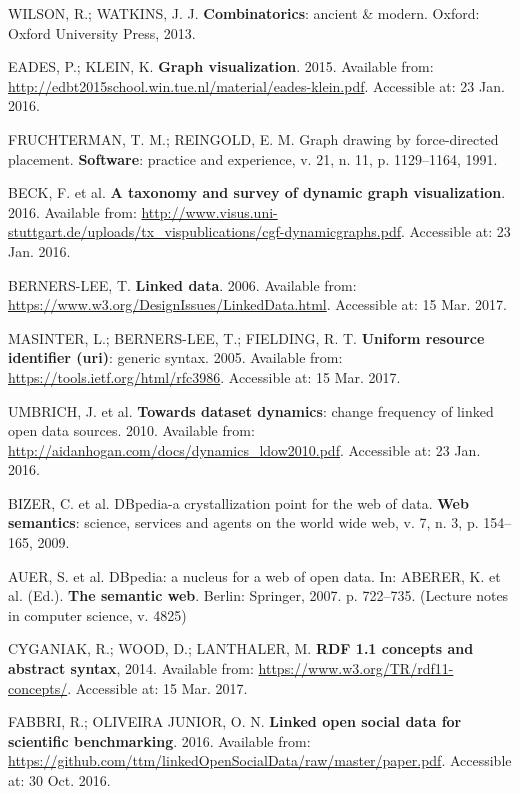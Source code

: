\documentclass[
12pt,		%
openright,	%
twoside,  %
a4paper,			%
chapter=TITLE,		%
english,			%
french,				%
spanish,			%
brazil				%
]{USPSC}
\begin{document}
\begin{thebibliography}{999}
	WILSON, R.; WATKINS, J. J. \textbf{Combinatorics}: ancient \& modern. Oxford: Oxford University Press, 2013.

	EADES, P.; KLEIN, K. \textbf{Graph visualization}. 2015. Available from: \url{http://edbt2015school.win.tue.nl/material/eades-klein.pdf}. Accessible at: 23 Jan. 2016.

	FRUCHTERMAN, T. M.; REINGOLD, E. M. Graph drawing by force-directed placement. \textbf{Software}: practice and experience, v. 21, n. 11, p. 1129–1164, 1991.

	BECK, F. et al. \textbf{A taxonomy and survey of dynamic graph visualization}. 2016. Available from: \url{http://www.visus.uni-stuttgart.de/uploads/tx_vispublications/cgf-dynamicgraphs.pdf}. Accessible at: 23 Jan. 2016.

	BERNERS-LEE, T. \textbf{Linked data}. 2006. Available from: \url{https://www.w3.org/DesignIssues/LinkedData.html}. Accessible at: 15 Mar. 2017.

	MASINTER, L.; BERNERS-LEE, T.; FIELDING, R. T. \textbf{Uniform resource identifier (uri)}: generic syntax. 2005. Available from: \url{https://tools.ietf.org/html/rfc3986}. Accessible at: 15 Mar. 2017.

	UMBRICH, J. et al. \textbf{Towards dataset dynamics}: change frequency of linked open data sources. 2010. Available from: \url{http://aidanhogan.com/docs/dynamics_ldow2010.pdf}. Accessible at: 23 Jan. 2016.

	BIZER, C. et al. DBpedia-a crystallization point for the web of data. \textbf{Web semantics}: science, services and agents on the world wide web, v. 7, n. 3, p. 154–165, 2009.

	AUER, S. et al. DBpedia: a nucleus for a web of open data. In: ABERER, K. et al. (Ed.). \textbf{The semantic web}. Berlin: Springer, 2007. p. 722–735. (Lecture notes in computer science, v. 4825)

	CYGANIAK, R.; WOOD, D.; LANTHALER, M. \textbf{RDF 1.1 concepts and abstract syntax}, 2014. Available from: \url{https://www.w3.org/TR/rdf11-concepts/}. Accessible at: 15 Mar. 2017.

	FABBRI, R.; OLIVEIRA JUNIOR, O. N. \textbf{Linked open social data for scientific benchmarking}. 2016. Available from: \url{https://github.com/ttm/linkedOpenSocialData/raw/master/paper.pdf}. Accessible at: 30 Oct. 2016.


\end{thebibliography}
\end{document}
